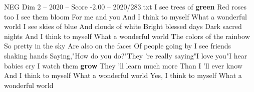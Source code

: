 \begin{textsample}{NEG Dim 2 – 2020 – Score -2.00 – 2020/283.txt}  \label{ex:f2_neg_024}
I see trees of \textbf{green} Red roses too I see them bloom For me and you And I think to myself What a wonderful world I see skies of blue And clouds of white Bright blessed days Dark sacred nights And I think to myself What a wonderful world The colors of the rainbow So pretty in the sky Are also on the faces Of people going by I see friends shaking hands Saying,"How do you do?"They 're really saying"I love you"I hear babies cry I watch them \textbf{grow} They 'll learn much more Than I 'll ever know And I think to myself What a wonderful world Yes, I think to myself What a wonderful world

\end{textsample}
